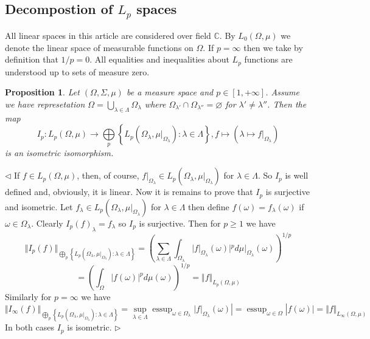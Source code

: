 \documentclass[12pt]{article}
\newtheorem{proposition}[theorem]{Proposition}
\newenvironment{proof}{\par $\triangleleft$}{$\triangleright$}
\begin{document}

\subsection{Decompostion of \texorpdfstring{$L_p$}{Lp} spaces}

All linear spaces in this article are considered over field $\mathbb{C}$. By
$L_0(\Omega,\mu)$ we denote the linear space of measurable functions on
$\Omega$. If $p=\infty$ then we take by definition that $1/p=0$. All equalities
and inequalities about $L_p$ functions are understood up to sets of measure
zero.

\begin{proposition}\label{LpSpDecomp} Let $(\Omega,\Sigma,\mu)$ be a measure
    space and $p\in[1,+\infty]$. Assume we have represetation
    $\Omega=\bigcup_{\lambda\in\Lambda}\Omega_\lambda$ where
    $\Omega_{\lambda'}\cap\Omega_{\lambda''}=\varnothing$ for
    $\lambda'\neq\lambda''$. Then the map
    $$
        I_p:L_p(\Omega,\mu)\to \bigoplus\limits_p \left \{
        L_p(\Omega_\lambda,\mu|_{\Omega_\lambda}):\lambda\in\Lambda
        \right \}, f\mapsto (\lambda\mapsto f|_{\Omega_\lambda})
    $$
    is an isometric isomorphism.
\end{proposition}
\begin{proof}
    If $f\in L_p(\Omega,\mu)$, then, of course, $f|_{\Omega_\lambda}\in
        L_p(\Omega_\lambda,\mu|_{\Omega_\lambda})$ for $\lambda\in\Lambda$.
    So $I_p$ is well defined and, obviously, it is linear. Now it is remains
    to prove that $I_p$ is surjective and isometric. Let $f_\lambda\in
        L_p(\Omega_\lambda,\mu|_{\Omega_\lambda})$ for $\lambda\in\Lambda$ then
    define $f(\omega)=f_\lambda(\omega)$ if $\omega\in \Omega_\lambda$. Clearly
    ${I_p(f)}_\lambda=f_\lambda$ so $I_p$ is surjective. Then for
    $p\geq 1$ we have
    $$
        \Vert I_p(f)\Vert_{\bigoplus\limits_p \left \{
        L_p(\Omega_\lambda,\mu|_{\Omega_\lambda}):\lambda\in\Lambda
        \right \}}
        ={\left(\sum\limits_{\lambda\in\Lambda}
        \int_{\Omega_\lambda}{|f|}_{\Omega_\lambda}(\omega)|^p
        d\mu|_{\Omega_\lambda}(\omega)
        \right)}^{1/p}
    $$
    $$
        ={\left(\int_{\Omega}{|f(\omega)|}^p d\mu(\omega)\right)}^{1/p}
        =\Vert f\Vert_{L_p(\Omega,\mu)}
    $$
    Similarly for $p=\infty$ we have
    $$
        \Vert I_\infty(f)\Vert_{\bigoplus\limits_p \left \{
        L_p(\Omega_\lambda,\mu|_{\Omega_\lambda}):\lambda\in\Lambda
        \right \}}
        =\sup\limits_{\lambda\in\Lambda}\mathop{\operatorname{essup}}_{
            \omega\in\Omega_\lambda}|f|_{\Omega_\lambda}(\omega)|
        =\mathop{\operatorname{essup}}_{\omega\in\Omega}|f(\omega)|
        =\Vert f\Vert_{L_\infty(\Omega,\mu)}
    $$
    In both cases $I_p$ is isometric.
\end{proof}
\end{document}
